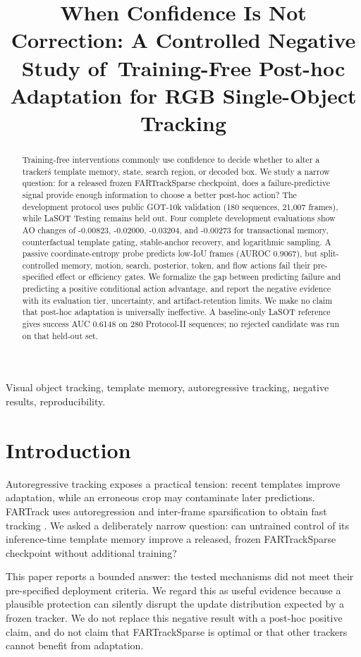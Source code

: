 \documentclass{article}
\title{When Confidence Is Not Correction: A Controlled Negative Study of\
Training-Free Post-hoc Adaptation for RGB Single-Object Tracking}
\begin{document}
\ninept
\maketitle
\begin{keywords}
Visual object tracking, template memory, autoregressive tracking, negative results, reproducibility.
\end{keywords}

\begin{abstract}
Training-free interventions commonly use confidence to decide whether to alter
a tracker\'s template memory, state, search region, or decoded box. We study a
narrow question: for a released frozen FARTrackSparse checkpoint, does a
failure-predictive signal provide enough information to choose a better
post-hoc action? The development protocol uses public GOT-10k validation (180
sequences, 21,007 frames), while LaSOT Testing remains held out. Four complete
development evaluations show AO changes of -0.00823, -0.02000, -0.03204, and
-0.00273 for transactional memory, counterfactual template gating,
stable-anchor recovery, and logarithmic sampling. A passive coordinate-entropy
probe predicts low-IoU frames (AUROC 0.9067), but split-controlled memory,
motion, search, posterior, token, and flow actions fail their pre-specified
effect or efficiency gates. We formalize the gap between predicting failure and
predicting a positive conditional action advantage, and report the negative
evidence with its evaluation tier, uncertainty, and artifact-retention limits.
We make no claim that post-hoc adaptation is universally ineffective. A
baseline-only LaSOT reference gives success AUC 0.6148 on 280 Protocol-II
sequences; no rejected candidate was run on that held-out set.
\end{abstract}

\section{Introduction}
Autoregressive tracking exposes a practical tension: recent templates improve
adaptation, while an erroneous crop may contaminate later predictions. FARTrack
uses autoregression and inter-frame sparsification to obtain fast tracking
\cite{wang2026fartrack}.  We asked a deliberately narrow question: can
untrained control of its inference-time template memory improve a released,
frozen FARTrackSparse checkpoint without additional training?

This paper reports a bounded answer: the tested mechanisms did not meet their
pre-specified deployment criteria. We regard this as useful evidence because a
plausible protection can silently disrupt the update distribution expected by a
frozen tracker. We do not replace this negative result with a post-hoc positive
claim, and do not claim that FARTrackSparse is optimal or that other trackers
cannot benefit from adaptation.
\end{document}
